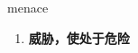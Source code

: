 
\begin{frame}
{\huge menace}
\begin{center}
\begin{enumerate}\Large
  \item \textbf{威胁，使处于危险}
\end{enumerate}
\end{center}
\end{frame}
